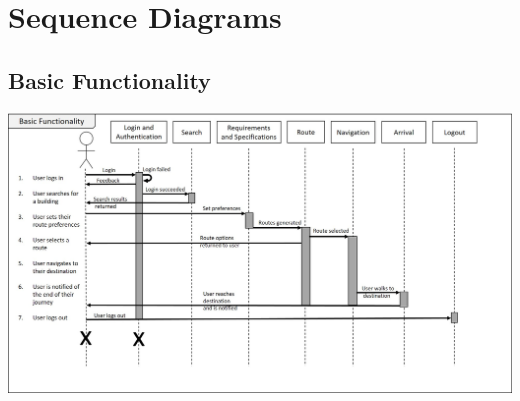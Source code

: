 \documentclass[12pt]{article}
\begin{document}
	

	

	

	

\section{Sequence Diagrams}

	

	\subsection{Basic Functionality}

	\includegraphics[width=\linewidth]{BasicFunctionality_SequenceDiagram_Schae.jpg}

	
  
\end{document}
